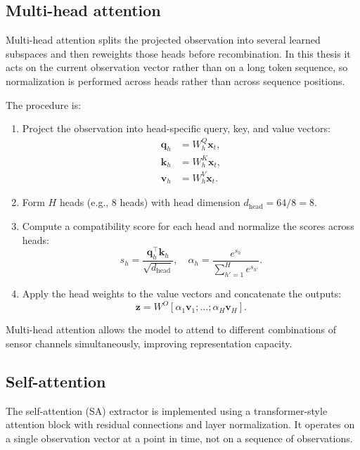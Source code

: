 \documentclass[12pt,oneside]{book}
\begin{document}
\subsection{Multi-head attention}
Multi-head attention splits the projected observation into several learned subspaces and then reweights those heads before recombination. In this thesis it acts on the current observation vector rather than on a long token sequence, so normalization is performed across heads rather than across sequence positions.

The procedure is:
\begin{enumerate}
\item Project the observation into head-specific query, key, and value vectors:
\begin{align}
\mathbf{q}_h &= W_h^Q \mathbf{x}_t,\\
\mathbf{k}_h &= W_h^K \mathbf{x}_t,\\
\mathbf{v}_h &= W_h^V \mathbf{x}_t.
\end{align}
\item Form $H$ heads (e.g., 8 heads) with head dimension $d_{\mathrm{head}} = 64/8 = 8$.
\item Compute a compatibility score for each head and normalize the scores across heads:
\begin{equation}
s_h = \frac{\mathbf{q}_h^\top \mathbf{k}_h}{\sqrt{d_{\mathrm{head}}}}, \quad \alpha_h = \frac{e^{s_h}}{\sum_{h'=1}^{H} e^{s_{h'}}}.
\end{equation}
\item Apply the head weights to the value vectors and concatenate the outputs:
\begin{equation}
\mathbf{z} = W^O [\alpha_1 \mathbf{v}_1; \ldots; \alpha_H \mathbf{v}_H].
\end{equation}
\end{enumerate}

Multi-head attention allows the model to attend to different combinations of sensor channels simultaneously, improving representation capacity.

\subsection{Self-attention}
The self-attention (SA) extractor is implemented using a transformer-style attention block with residual connections and layer normalization. It operates on a single observation vector at a point in time, not on a sequence of observations.
\end{document}
